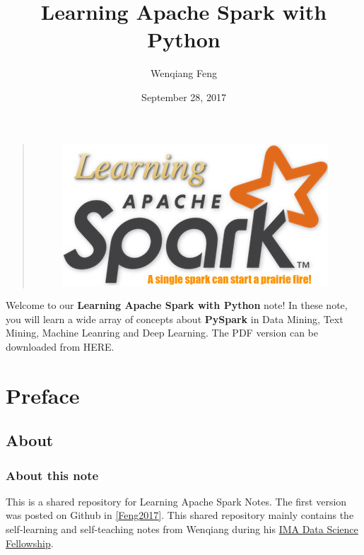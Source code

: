 \documentclass[letterpaper,11pt,english]{sphinxmanual}
\title{Learning Apache Spark with Python}
\date{September 28, 2017}
\author{Wenqiang Feng}
\begin{document}
\maketitle
\tableofcontents
{}\label{index::doc}\label{index:index}\begin{quote}
\begin{figure}[htbp]
\centering

\includegraphics{logo.jpg}
\label{index:fig-logo}\end{figure}
\end{quote}

Welcome to our \textbf{Learning Apache Spark with Python} note!
In these note, you will learn a wide array of concepts about
\textbf{PySpark} in Data Mining, Text Mining, Machine Leanring
and Deep Learning. The PDF version can be downloaded from HERE.




\chapter{Preface}
\label{preface:id1}\label{preface::doc}\label{preface:contents}\label{preface:preface}

\section{About}
\label{preface:about}

\subsection{About this note}
\label{preface:about-this-note}
This is a shared repository for Learning Apache Spark Notes.
The first version was posted on Github in {\hyperref[reference:feng2017]{{[}Feng2017{]}}}.
This shared repository mainly contains the self-learning and
self-teaching notes from Wenqiang during his \href{https://www.ima.umn.edu/2016-2017/SW1.23-3.10.17\#}{IMA Data Science
Fellowship}.
\end{document}

